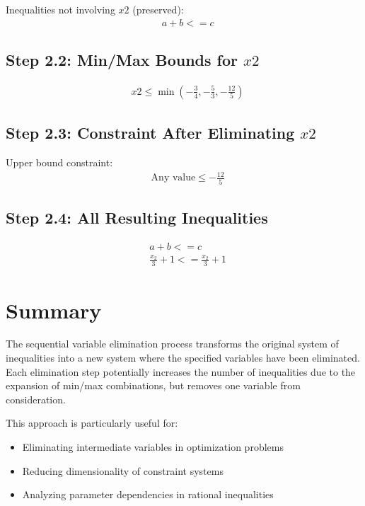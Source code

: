 \documentclass{article}
\begin{document}
Inequalities not involving $x2$ (preserved):
\begin{align}
& a + b <= c
\end{align}

\subsection{Step 2.2: Min/Max Bounds for $x2$}

\begin{align}
& x2 \leq \min\left(- \frac{3}{4}, - \frac{5}{3}, - \frac{12}{5}\right)
\end{align}

\subsection{Step 2.3: Constraint After Eliminating $x2$}

Upper bound constraint:
\begin{align}
& \text{Any value} \leq - \frac{12}{5}
\end{align}

\subsection{Step 2.4: All Resulting Inequalities}

\begin{align}
& a + b <= c \\
& \frac{x_{2}}{3} + 1 <= \frac{x_{2}}{3} + 1
\end{align}


\section{Summary}

The sequential variable elimination process transforms the original system of inequalities 
into a new system where the specified variables have been eliminated. Each elimination 
step potentially increases the number of inequalities due to the expansion of min/max 
combinations, but removes one variable from consideration.

This approach is particularly useful for:
\begin{itemize}
\item Eliminating intermediate variables in optimization problems
\item Reducing dimensionality of constraint systems
\item Analyzing parameter dependencies in rational inequalities
\end{itemize}
\end{document}
